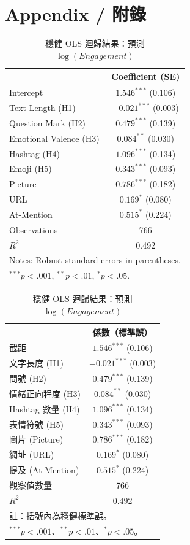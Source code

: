 \documentclass[12pt,a4paper,fontset=none]{ctexart}
\begin{document}
\newpage
\appendix
\section{Appendix / 附錄}

\begin{table}[h]
\centering
\caption{Robust OLS Regression Results predicting Log(Engagement)}
\label{tab:results}
\begin{tabular}{l c}
\toprule
 & \textbf{Coefficient (SE)} \\
\midrule
Intercept & $1.546^{***}$ (0.106) \\
Text Length (H1) & $-0.021^{***}$ (0.003) \\
Question Mark (H2) & $0.479^{***}$ (0.139) \\
Emotional Valence (H3) & $0.084^{**}$ (0.030) \\
Hashtag (H4) & $1.096^{***}$ (0.134) \\
Emoji (H5) & $0.343^{***}$ (0.093) \\
\midrule
Picture & $0.786^{***}$ (0.182) \\
URL & $0.169^{*}$ (0.080) \\
At-Mention & $0.515^{*}$ (0.224) \\
\midrule
Observations & 766 \\
$R^2$ & 0.492 \\
\bottomrule
\multicolumn{2}{l}{\small Notes: Robust standard errors in parentheses.}\\
\multicolumn{2}{l}{\small $^{***} p<.001$, $^{**} p<.01$, $^* p<.05$.}
\end{tabular}

\vspace{2em}

\caption{穩健 OLS 迴歸結果：預測 $\log(Engagement)$}
\label{tab:results_tw}
\begin{tabular}{l c}
\toprule
 & \textbf{係數（標準誤）} \\
\midrule
截距 & $1.546^{***}$ (0.106) \\
文字長度 (H1) & $-0.021^{***}$ (0.003) \\
問號 (H2) & $0.479^{***}$ (0.139) \\
情緒正向程度 (H3) & $0.084^{**}$ (0.030) \\
Hashtag 數量 (H4) & $1.096^{***}$ (0.134) \\
表情符號 (H5) & $0.343^{***}$ (0.093) \\
\midrule
圖片 (Picture) & $0.786^{***}$ (0.182) \\
網址 (URL) & $0.169^{*}$ (0.080) \\
提及 (At-Mention) & $0.515^{*}$ (0.224) \\
\midrule
觀察值數量 & 766 \\
$R^2$ & 0.492 \\
\bottomrule
\multicolumn{2}{l}{\small 註：括號內為穩健標準誤。}\\
\multicolumn{2}{l}{\small $^{***} p<.001$、$^{**} p<.01$、$^* p<.05$。}
\end{tabular}
\end{table}
\end{document}
